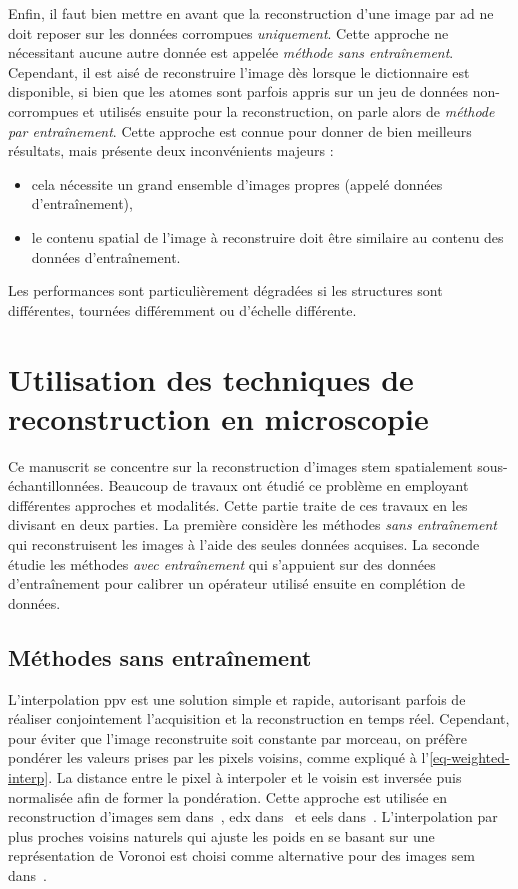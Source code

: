 Enfin, il faut bien mettre en avant que la reconstruction d'une image par \gls{ad} ne doit reposer sur les données corrompues \emph{uniquement}. Cette approche ne nécessitant aucune autre donnée est appelée \emph{méthode sans entraînement}. Cependant, il est aisé de reconstruire l'image dès lorsque le dictionnaire est disponible, si bien que les atomes sont parfois appris sur un jeu de données non-corrompues et utilisés ensuite pour la reconstruction, on parle alors de \emph{méthode par entraînement}. Cette approche est connue pour donner de bien meilleurs résultats, mais présente deux inconvénients majeurs :
\begin{itemize}
    \item cela nécessite un grand ensemble d'images propres (appelé données d'entraînement),
    \item le contenu spatial de l'image à reconstruire doit être similaire au contenu des données d'entraînement.
\end{itemize}
Les performances sont particulièrement dégradées si les structures sont différentes, tournées différemment ou d'échelle différente.



%
\section{Utilisation des techniques de reconstruction en microscopie}

Ce manuscrit se concentre sur la reconstruction d'images \gls{stem} spatialement sous-échantillonnées. Beaucoup de travaux ont étudié ce problème en employant différentes approches et modalités. Cette partie traite de ces travaux en les divisant en deux parties. La première considère les méthodes \emph{sans entraînement} qui reconstruisent les images à l'aide des seules données acquises. La seconde étudie les méthodes \emph{avec entraînement} qui s'appuient sur des données d'entraînement pour calibrer un opérateur utilisé ensuite en complétion de données.

\subsection{Méthodes sans entraînement}

L'interpolation \gls{ppv} est une solution simple et rapide, autorisant parfois de réaliser conjointement l'acquisition et la reconstruction en temps réel. Cependant, pour éviter que l'image reconstruite soit constante par morceau, on préfère pondérer les valeurs prises par les pixels voisins, comme expliqué à l'\cref{eq-weighted-interp}. La distance entre le pixel à interpoler et le voisin est inversée puis normalisée afin de former la pondération. Cette approche est utilisée en reconstruction d'images \gls{sem} dans~\cite{godaliyadda2018tci}, \gls{edx} dans~\cite{zhang2018reduced, hujsak2018high} et \gls{eels} dans~\cite{hujsak2018high}. L'interpolation par plus proches voisins naturels qui ajuste les poids en se basant sur une représentation de Voronoi est choisi comme alternative pour des images \gls{sem} dans~\cite{trampert2018ultramicroscopy}.

